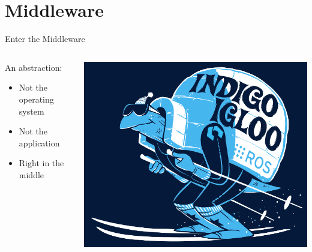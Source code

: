 \documentclass{beamer}
\begin{document}
\section{Middleware}
\begin{frame}{Enter the Middleware}
\begin{columns}
	\begin{column}{0.55\textwidth}
An abstraction:
		\begin{itemize}
			\item Not the operating system
                        \item Not the application
                        \item Right in the middle
		\end{itemize} \end{column} \begin{column}{0.45\textwidth} \centering \includegraphics[width=\textwidth]{fig/indigoigloo_600.png} \end{column}
\end{columns}

\end{frame}
\end{document}

